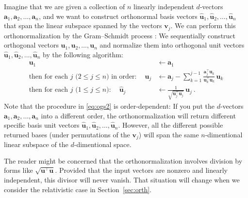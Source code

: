 \documentclass{article}
\newcommand{\Evec}[1]{{\mathbf{#1}}} %
\newcommand{\Ehat}[1]{{\mathbf{\hat{#1}}}} %
\newcommand{\secref}[1]{Section~\ref{#1}}
\begin{document}
Imagine that we are given a collection of $n$ linearly independent $d$-vectors $\Evec{a}_1,\Evec{a}_2,\ldots,\Evec{a}_n$,
and we want to construct orthonormal basis vectors $\Ehat{u}_1,\Ehat{u}_2,\ldots,\Ehat{u}_n$ that span the linear subspace spanned by the vectors $\Evec{v}_j$.
We can perform this orthonormalization by the Gram--Schmidt process \cite{gram, schmidt}:
We sequentially construct orthogonal vectors $\Evec{u}_1,\Evec{u}_2,\ldots,\Evec{u}_n$ and normalize them into orthogonal unit vectors $\Ehat{u}_1,\Ehat{u}_2,\ldots,\Ehat{u}_n$ by the following algorithm:
\begin{align}
    \Evec{u}_1 &\leftarrow \Evec{a}_1 \label{eq:ogs1}
    \\
    \mbox{then for each $j$ ($2\leq j\leq n$) in order:} \quad~ \Evec{u}_j &\leftarrow \Evec{a}_j - \sum_{k=1}^{j-1} \frac{\Evec{a}_j^\top\Evec{u}_k}{\Evec{u}_k^\top\Evec{u}_k}\,\Evec{u}_k \label{eq:ogs2}
    \\
    \mbox{then for each $j$ ($1\leq j\leq n$):} \quad~ \Ehat{u}_j &\leftarrow \frac{1}{\sqrt{\Evec{u}_j^\top\Evec{u}_j}}\,\Evec{u}_j ~. \label{eq:ogs3}
\end{align}
Note that the procedure in \eqref{eq:ogs2} is order-dependent: If you put the $d$-vectors $\Evec{a}_1,\Evec{a}_2,\ldots,\Evec{a}_n$ into a different order, the orthonormalization will return different specific basis unit vectors $\Ehat{u}_1,\Ehat{u}_2,\ldots,\Ehat{u}_n$.
However, all the different possible returned bases (under permutations of the $\Evec{v}_j$) will span the same $n$-dimentional linear subspace of the $d$-dimentional space.

The reader might be concerned that the orthonormalization involves division by forms like $\sqrt{\Evec{u}^\top\Evec{u}}$.
Provided that the input vectors are nonzero and linearly independent, this divisor will never vanish.
That situation will change when we consider the relativistic case in \secref{sec:orth}.
\end{document}
